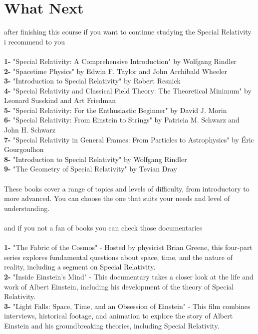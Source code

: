 \documentclass{article}
\begin{document}
\section{What Next}
after finishing this course if you want to continue studying the Special Relativity 
i recommend to you 
\\
\\\textbf{1-} "Special Relativity: A Comprehensive Introduction" by Wolfgang Rindler
\\\textbf{2-} "Spacetime Physics" by Edwin F. Taylor and John Archibald Wheeler
\\\textbf{3-} "Introduction to Special Relativity" by Robert Resnick
\\\textbf{4-} "Special Relativity and Classical Field Theory: The Theoretical Minimum" by Leonard Susskind and Art Friedman
\\\textbf{5-} "Special Relativity: For the Enthusiastic Beginner" by David J. Morin
\\\textbf{6-} "Special Relativity: From Einstein to Strings" by Patricia M. Schwarz and John H. Schwarz
\\\textbf{7-} "Special Relativity in General Frames: From Particles to Astrophysics" by Éric Gourgoulhon
\\\textbf{8-} "Introduction to Special Relativity" by Wolfgang Rindler
\\\textbf{9-} "The Geometry of Special Relativity" by Tevian Dray
\\\\
These books cover a range of topics and levels of difficulty, from introductory to more advanced. You can choose the one that suits your needs and level of understanding.
\\\\
and if you not a fan of books you can check those documentaries
\\
\\\textbf{1-} "The Fabric of the Cosmos" - Hosted by physicist Brian Greene, this four-part series explores fundamental questions about space, time, and the nature of reality, including a segment on Special Relativity.
\\\textbf{2-} "Inside Einstein's Mind" - This documentary takes a closer look at the life and work of Albert Einstein, including his development of the theory of Special Relativity.
\\\textbf{3-} "Light Falls: Space, Time, and an Obsession of Einstein" - This film combines interviews, historical footage, and animation to explore the story of Albert Einstein and his groundbreaking theories, including Special Relativity.
\end{document}
